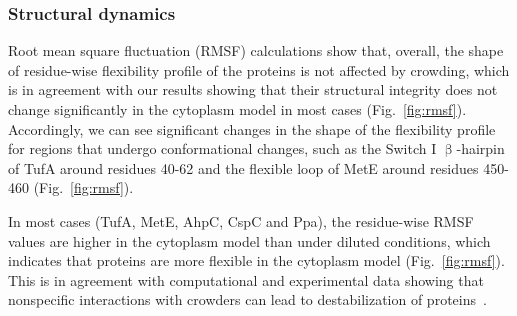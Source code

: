 \documentclass[journal=jcisd8,manuscript=article]{achemso}
\begin{document}
\subsubsection{Structural dynamics}
  
Root mean square fluctuation (RMSF) calculations show that, overall, the shape of residue-wise flexibility profile of the proteins is not affected by crowding, which is in agreement with our results showing that their structural integrity does not change significantly in the cytoplasm model in most cases (Fig.~\ref{fig:rmsf}). Accordingly, we can see significant changes in the shape of the flexibility profile for regions that undergo conformational changes, such as the Switch I $\upbeta$-hairpin of TufA around residues 40-62 and the flexible loop of MetE around residues 450-460 (Fig.~\ref{fig:rmsf}).

In most cases (TufA, MetE, AhpC, CspC and Ppa), the residue-wise RMSF values are higher in the cytoplasm model than under diluted conditions, which indicates that proteins are more flexible in the cytoplasm model (Fig.~\ref{fig:rmsf}). This is in agreement with computational and experimental data showing that nonspecific interactions with crowders can lead to destabilization of
proteins~\cite{Feig2011, miklos2011, Wang2012b}.
\end{document}
